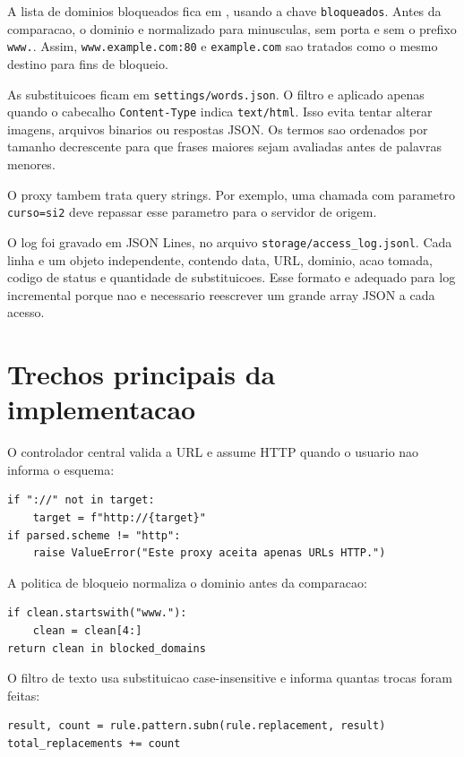 \documentclass[12pt,a4paper]{article}
\begin{document}
A lista de dominios bloqueados fica em , usando a chave \texttt{bloqueados}. Antes da comparacao, o dominio e normalizado para minusculas, sem porta e sem o prefixo \texttt{www.}. Assim, \texttt{www.example.com:80} e \texttt{example.com} sao tratados como o mesmo destino para fins de bloqueio.

As substituicoes ficam em \texttt{settings/words.json}. O filtro e aplicado apenas quando o cabecalho \texttt{Content-Type} indica \texttt{text/html}. Isso evita tentar alterar imagens, arquivos binarios ou respostas JSON. Os termos sao ordenados por tamanho decrescente para que frases maiores sejam avaliadas antes de palavras menores.

O proxy tambem trata query strings. Por exemplo, uma chamada com parametro \texttt{curso=si2} deve repassar esse parametro para o servidor de origem.

O log foi gravado em JSON Lines, no arquivo \texttt{storage/access\_log.jsonl}. Cada linha e um objeto independente, contendo data, URL, dominio, acao tomada, codigo de status e quantidade de substituicoes. Esse formato e adequado para log incremental porque nao e necessario reescrever um grande array JSON a cada acesso.

\section{Trechos principais da implementacao}

O controlador central valida a URL e assume HTTP quando o usuario nao informa o esquema:

\begin{verbatim}
if "://" not in target:
    target = f"http://{target}"
if parsed.scheme != "http":
    raise ValueError("Este proxy aceita apenas URLs HTTP.")
\end{verbatim}

A politica de bloqueio normaliza o dominio antes da comparacao:

\begin{verbatim}
if clean.startswith("www."):
    clean = clean[4:]
return clean in blocked_domains
\end{verbatim}

O filtro de texto usa substituicao case-insensitive e informa quantas trocas foram feitas:

\begin{verbatim}
result, count = rule.pattern.subn(rule.replacement, result)
total_replacements += count
\end{verbatim}
\end{document}
